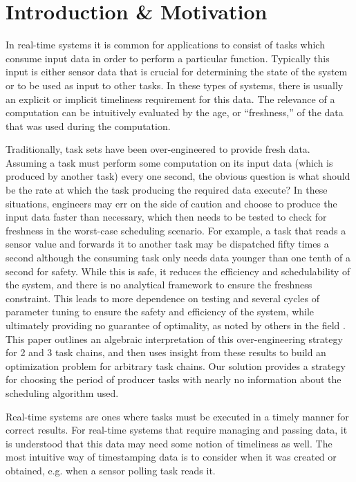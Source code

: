 \section{Introduction \& Motivation}

In real-time systems it is common for applications to consist of tasks which consume input data in order to perform a particular function. Typically this input is either sensor data that is crucial for determining the state of the system or to be used as input to other tasks. In these types of systems, there is usually an explicit or implicit timeliness requirement for this data. The relevance of a computation can be intuitively evaluated by the age, or ``freshness,'' of the data that was used during the computation.

Traditionally, task sets have been over-engineered to provide fresh data. Assuming a task must perform some computation on its input data (which is produced by another task) every one second, the obvious question is what should be the rate at which the task producing the required data execute? In these situations, engineers may err on the side of caution and choose to produce the input data faster than necessary, which then needs to be tested to check for freshness in the worst-case scheduling scenario. For example, a task that reads a sensor value and forwards it to another task may be dispatched fifty times a second although the consuming task only needs data younger than one tenth of a second for safety. While this is safe, it reduces the efficiency and schedulability of the system, and there is no analytical framework to ensure the freshness constraint. This leads to more dependence on testing and several cycles of parameter tuning to ensure the safety and efficiency of the system, while ultimately providing no guarantee of optimality, as noted by others in the field \cite{BiniNatale,SetoLehoczkySha,ChantemWangLemmonHu,BelwalCheng}. This paper outlines an algebraic interpretation of this over-engineering strategy for 2 and 3 task chains, and then uses insight from these results to build an optimization problem for arbitrary task chains. Our solution provides a strategy for choosing the period of producer tasks with nearly no information about the scheduling algorithm used.

Real-time systems are ones where tasks must be executed in a timely manner for correct results. For real-time systems that require managing and passing data, it is understood that this data may need some notion of timeliness as well. The most intuitive way of timestamping data is to consider when it was created or obtained, e.g. when a sensor polling task reads it.

